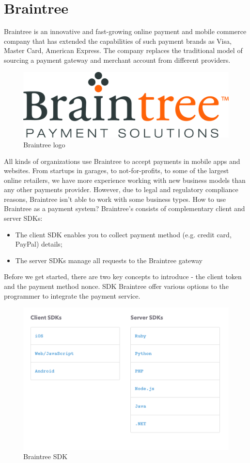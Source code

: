\section{Braintree}
\label{sec:braintree}
Braintree is an innovative and fast-growing online payment and mobile commerce company that has extended the capabilities of such payment brands as Visa, Master Card, American Express.
The company replaces the traditional model of sourcing a payment gateway and merchant account from different providers.
\begin{figure}[htb]
\centering
\includegraphics[width=0.5\linewidth]{images/chapter2/braintree-logo.jpg}\hfill
\caption[Braintree logo]{Braintree logo}
\label{fig:stripe_logo}
\end{figure}
All kinds of organizations use Braintree to accept payments in mobile apps and websites. From startups in garages, to not-for-profits, to some of the largest online retailers, we have more experience working with new business models than any other payments provider. However, due to legal and regulatory compliance reasons, Braintree isn't able to work with some business types. How to use Braintree as a payment system?
Braintree's  consists of complementary client and server SDKs:
\begin{itemize}
\item The client SDK enables you to collect payment method (e.g. credit card, PayPal) details;
\item The server SDKs manage all requests to the Braintree gateway
\end{itemize}
Before we get started, there are two key concepts to introduce - the client token and the payment method nonce.
\newline
SDK Braintree offer various options to the programmer to integrate the payment service.
\begin{figure}[htb]
\centering
\includegraphics[width=1.0\linewidth]{images/chapter2/braintree-sdk.png}\hfill
\caption[Braintree SDK]{Braintree SDK}
\label{fig:braintree_sdk}
\end{figure}
